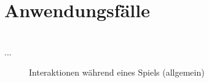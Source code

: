 	
\clearpage
	
\section{Anwendungsfälle}

~\\
...

	\begin{figure}[ht]
	  \centering
	  
	  \caption{Interaktionen während eines Spiels (allgemein)}
	\end{figure}

%	  

